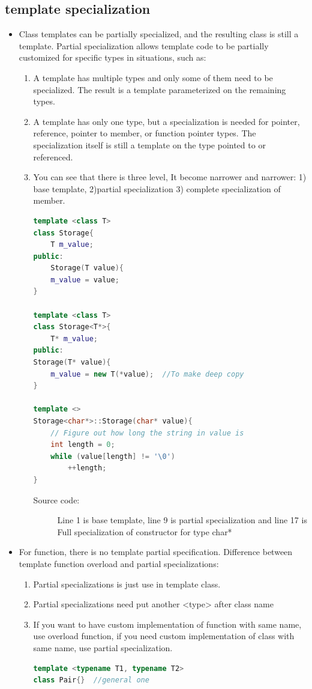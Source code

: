 \documentclass[a4paper,11pt,twoside]{book}
\begin{document}
\subsection{template specialization}
\begin{itemize}
	\item Class templates can be partially specialized, and the resulting class is still a template. Partial specialization allows template code to be partially customized for specific types in situations, such as:

	\begin{enumerate}
		\item A template has multiple types and only some of them need to be specialized. The result is a template parameterized on the remaining types.

		\item A template has only one type, but a specialization is needed for pointer, reference, pointer to member, or function pointer types. The specialization itself is still a template on the type pointed to or referenced.


		\item You can see that there is three level, It become narrower and narrower: 1) base template, 2)partial specialization 3) complete specialization of member.
\begin{lstlisting}[frame=single, language=c++]
template <class T>
class Storage{
	T m_value;
public:
	Storage(T value){
	m_value = value;
}

template <class T>
class Storage<T*>{
	T* m_value;
public:
Storage(T* value){
	m_value = new T(*value);  //To make deep copy
}

template <>
Storage<char*>::Storage(char* value){
	// Figure out how long the string in value is
	int length = 0;
	while (value[length] != '\0')
		++length;
}
\end{lstlisting}
\begin{description}
	\item[Source code:] Line 1 is base template, line 9 is partial specialization and line 17 is Full specialization of constructor for type char* 
\end{description}

\end{enumerate}

	\item For function, there is no template partial specification. Difference between template function overload and partial specializations:
\begin{enumerate}
	\item Partial specializations is just use in template class.
	\item Partial specializations need put another <type> after class name
	\item If you want to have custom implementation of function with same name, use overload function, if you need  custom implementation of class with same name, use partial specialization.
\begin{lstlisting}[frame=single, language=c++]
template <typename T1, typename T2>
class Pair{}  //general one


\end{lstlisting}
\end{enumerate}
\end{itemize}
\end{document}
